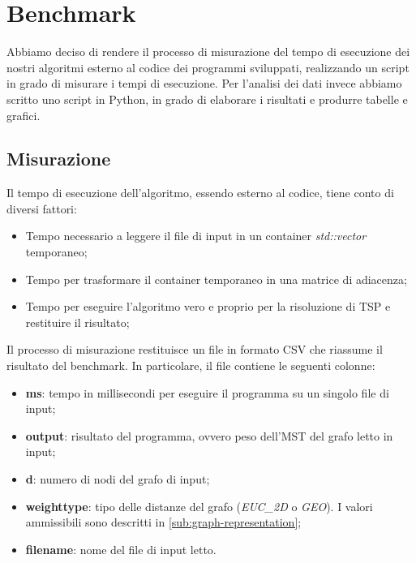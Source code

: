 \section{Benchmark}
\label{cap:benchmark-process}

Abbiamo deciso di rendere il processo di misurazione del tempo di
esecuzione dei nostri algoritmi esterno al codice dei programmi
sviluppati, realizzando un script in grado di misurare i tempi di
esecuzione. Per l'analisi dei dati invece abbiamo scritto uno script
in Python, in grado di elaborare i risultati e produrre tabelle e
grafici.

\subsection{Misurazione}

Il tempo di esecuzione dell'algoritmo, essendo esterno al codice,
tiene conto di diversi fattori:

\begin{itemize}
    \item Tempo necessario a leggere il file di input in un container
      \textit{std::vector} temporaneo;
    \item Tempo per trasformare il container temporaneo in una matrice
      di adiacenza;
    \item Tempo per eseguire l'algoritmo vero e proprio per la
      risoluzione di TSP e restituire il risultato;
\end{itemize}

\noindent Il processo di misurazione restituisce un file in formato
CSV che riassume il risultato del benchmark. In particolare, il file
contiene le seguenti colonne:

\begin{itemize}
    \item \textbf{ms}: tempo in millisecondi per eseguire il programma
      su un singolo file di input;
    \item \textbf{output}: risultato del programma, ovvero peso
      dell'MST del grafo letto in input;
    \item \textbf{d}: numero di nodi del grafo di input;
    \item \textbf{weight\textunderscore type}: tipo delle distanze del
      grafo (\textit{EUC\_2D} o \textit{GEO}). I valori ammissibili sono descritti in \ref{sub:graph-representation};
    \item \textbf{filename}: nome del file di input letto.
\end{itemize}

